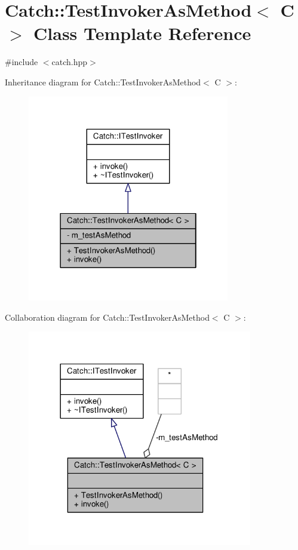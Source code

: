 \hypertarget{class_catch_1_1_test_invoker_as_method}{\section{Catch\-:\-:Test\-Invoker\-As\-Method$<$ C $>$ Class Template Reference}
\label{class_catch_1_1_test_invoker_as_method}
}


{\ttfamily \#include $<$catch.\-hpp$>$}



Inheritance diagram for Catch\-:\-:Test\-Invoker\-As\-Method$<$ C $>$\-:
\nopagebreak
\begin{figure}[H]
\begin{center}
\leavevmode
\includegraphics[width=250pt]{class_catch_1_1_test_invoker_as_method__inherit__graph}
\end{center}
\end{figure}


Collaboration diagram for Catch\-:\-:Test\-Invoker\-As\-Method$<$ C $>$\-:
\nopagebreak
\begin{figure}[H]
\begin{center}
\leavevmode
\includegraphics[width=278pt]{class_catch_1_1_test_invoker_as_method__coll__graph}
\end{center}
\end{figure}
